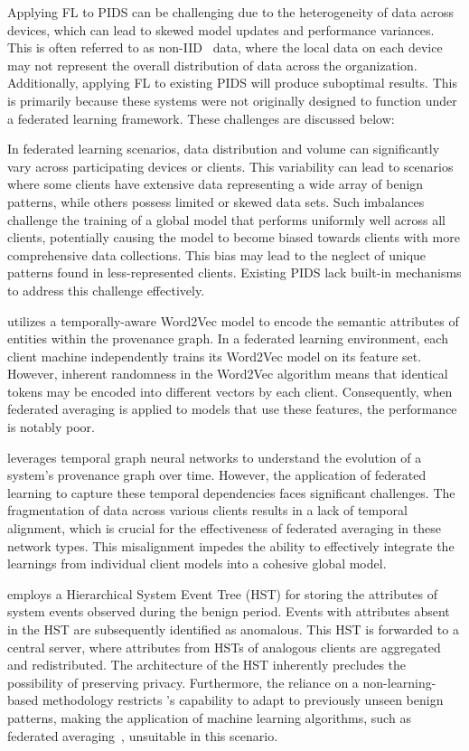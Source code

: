 Applying FL to PIDS can be challenging due to the heterogeneity of data across devices, which can lead to skewed model updates and performance variances. This is often referred to as non-IID~\cite{zhao2018federated} data, where the local data on each device may not represent the overall distribution of data across the organization. Additionally, applying FL to existing PIDS will produce suboptimal results. This is primarily because these systems were not originally designed to function under a federated learning framework. These challenges are discussed below:

 In federated learning scenarios, data distribution and volume can significantly vary across participating devices or clients. This variability can lead to scenarios where some clients have extensive data representing a wide array of benign patterns, while others possess limited or skewed data sets. Such imbalances challenge the training of a global model that performs uniformly well across all clients, potentially causing the model to become biased towards clients with more comprehensive data collections. This bias may lead to the neglect of unique patterns found in less-represented clients. Existing PIDS lack built-in mechanisms to address this challenge effectively.

 \flash utilizes a temporally-aware Word2Vec model to encode the semantic attributes of entities within the provenance graph. In a federated learning environment, each client machine independently trains its Word2Vec model on its feature set. However, inherent randomness in the Word2Vec algorithm means that identical tokens may be encoded into different vectors by each client. Consequently, when federated averaging is applied to \gnn models that use these features, the performance is notably poor.

 \kairos leverages temporal graph neural networks to understand the evolution of a system's provenance graph over time. However, the application of federated learning to capture these temporal dependencies faces significant challenges. The fragmentation of data across various clients results in a lack of temporal alignment, which is crucial for the effectiveness of federated averaging in these network types. This misalignment impedes the ability to effectively integrate the learnings from individual client models into a cohesive global model.

 \disdet employs a Hierarchical System Event Tree (HST) for storing the attributes of system events observed during the benign period. Events with attributes absent in the HST are subsequently identified as anomalous. This HST is forwarded to a central server, where attributes from HSTs of analogous clients are aggregated and redistributed. The architecture of the HST inherently precludes the possibility of preserving privacy. Furthermore, the reliance on a non-learning-based methodology restricts \disdet's capability to adapt to previously unseen benign patterns, making the application of machine learning algorithms, such as federated averaging~\cite{mcmahan2017communication}, unsuitable in this scenario.


